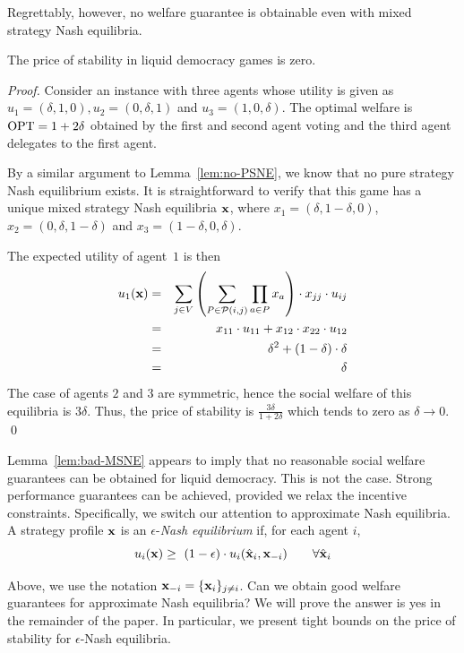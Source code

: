 Regrettably, however, no welfare guarantee is obtainable even with mixed strategy Nash equilibria.

 \begin{lem}\label{lem:bad-MSNE}
The price of stability in liquid democracy games is zero. 
\end{lem}
\begin{proof}
	
	Consider an instance with three agents whose utility is given as $u_1=(\delta,1,0),u_2=(0,\delta,1) $ and $u_3=(1,0,\delta)$. The optimal welfare is $\operatorname{OPT}=1+2\delta$ obtained by the first and second agent voting and the third agent delegates to the first agent.  
	
	By a similar argument to Lemma~\ref{lem:no-PSNE}, we know that no pure strategy Nash equilibrium exists. It is straightforward to verify that this game has a unique mixed strategy Nash equilibria ${\bf x}$, where $x_1=(\delta,1-\delta,0)$, $x_2=(0,\delta,1-\delta)$ and $x_3 =(1-\delta, 0, \delta) $. 
	
 The expected utility of agent~$1$ is then
\begin{eqnarray*}
u_1({\bf x}) &=& \sum_{j\in V} \left( \sum_{P \in \mathcal{P}(i,j)}  \prod\limits_{a\in P}  x_a \right)  \cdot x_{jj} \cdot u_{ij} \\
&=& x_{11} \cdot u_{11} + x_{12}\cdot x_{22} \cdot u_{12}  \\
&=& \delta^2 + (1-\delta)\cdot \delta \\
&=& \delta
 \end{eqnarray*}
The case of agents $2$ and $3$ are symmetric, hence the social welfare of this equilibria is $3\delta$. 
Thus, the price of stability is $\frac{3\delta}{1+2\delta}$ which tends to zero
as $\delta\rightarrow 0$. \qed 
\end{proof}

Lemma~\ref{lem:bad-MSNE} appears to imply that no reasonable social welfare guarantees
can be obtained for liquid democracy. This is not the case. Strong performance guarantees
can be achieved, provided we relax the incentive constraints.
Specifically, we switch our attention to approximate Nash equilibria.
A strategy profile ${\bf x}$ is an $\epsilon$-{\em Nash equilibrium} if, for each agent $i$, 
$$u_{i}({\bf x})\geq \ (1-\epsilon)\cdot u_{i}(\hat{{\bf x}}_i,{\bf x}_{-i}) \qquad \forall \hat{{\bf x}}_i $$

Above, we use the notation ${\bf x}_{-i}=\{{\bf x}_i\}_{j\neq i}$.
Can we obtain good welfare guarantees for approximate Nash equilibria? We will prove the answer is {\sc yes}
in the remainder of the paper. In particular, we present tight bounds on the price of stability for $\epsilon$-Nash equilibria.

